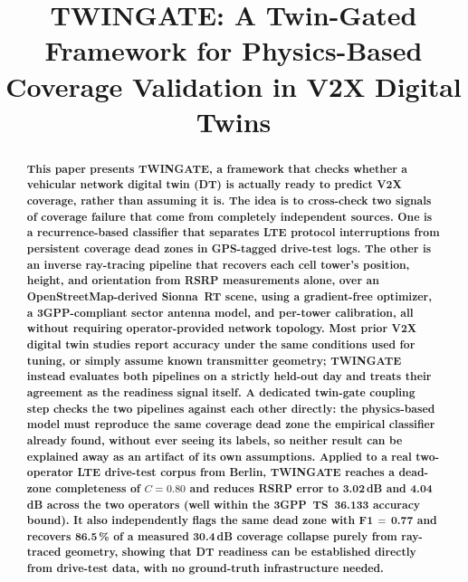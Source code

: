 \documentclass[conference]{IEEEtran}
\begin{document}
\title{TWINGATE: A Twin-Gated Framework for Physics-Based\\
       Coverage Validation in V2X Digital Twins}


\maketitle

\begin{abstract}
\bfseries
This paper presents TWINGATE, a framework that checks whether a
vehicular network digital twin (DT) is actually ready to predict V2X
coverage, rather than assuming it is. The idea is to cross-check two
signals of coverage failure that come from completely independent
sources. One is a recurrence-based classifier that separates LTE
protocol interruptions from persistent coverage dead zones in
GPS-tagged drive-test logs. The other is an inverse ray-tracing
pipeline that recovers each cell tower's position, height, and
orientation from RSRP measurements alone, over an OpenStreetMap-derived
Sionna~RT scene, using a gradient-free optimizer, a 3GPP-compliant
sector antenna model, and per-tower calibration, all without requiring
operator-provided network topology. Most prior V2X digital twin studies
report accuracy under the same conditions used for tuning, or simply
assume known transmitter geometry; TWINGATE instead evaluates both
pipelines on a strictly held-out day and treats their agreement as the
readiness signal itself. A dedicated twin-gate coupling step checks the
two pipelines against each other directly: the physics-based model must
reproduce the same coverage dead zone the empirical classifier already
found, without ever seeing its labels, so neither result can be
explained away as an artifact of its own assumptions. Applied to a
real two-operator LTE drive-test corpus from Berlin, TWINGATE reaches a
dead-zone completeness of $C=0.80$ and reduces RSRP error to 3.02\,dB
and 4.04\,dB across the two operators (well within the
3GPP~TS~36.133 accuracy bound). It also independently flags the same
dead zone with F1\,$=$\,0.77 and recovers 86.5\,\% of a measured
30.4\,dB coverage collapse purely from ray-traced geometry, showing
that DT readiness can be established directly from drive-test data,
with no ground-truth infrastructure needed.
\end{abstract}
\end{document}
